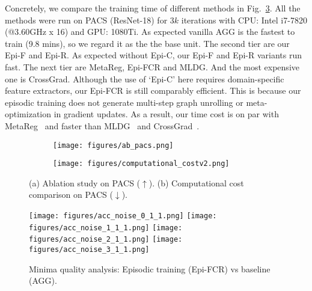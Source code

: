 \documentclass[10pt,twocolumn,letterpaper]{article}
\begin{document}
Concretely, we compare the training time of different methods in Fig.~\ref{fig:comp-cost}. All the methods were run on PACS (ResNet-18) for $3k$ iterations with CPU: Intel i7-7820 (@3.60GHz x 16) and GPU: 1080Ti. As expected vanilla AGG is the fastest to train (9.8 mins), so we regard it as the the base unit. The second tier are our Epi-F and Epi-R. As expected without Epi-C, our Epi-F and Epi-R variants run fast. The next tier are MetaReg, Epi-FCR and MLDG. And the most expensive one is CrossGrad. Although the use of `Epi-C' here requires domain-specific feature extractors, our Epi-FCR is still comparably efficient. This is because our episodic training does not generate multi-step graph unrolling or meta-optimization in gradient updates. As a result, our time cost is on par with MetaReg~\cite{NIPS2018_metareg} and faster than MLDG~\cite{Li2018MLDG} and CrossGrad~\cite{shankar2018generalizing}. 







\begin{figure}[t]
    \centering
    \begin{subfigure}[b]{0.4185\linewidth}
    \texttt{[image: figures/ab\_pacs.png]}
    \vspace{-0.77cm}
    \caption{}
    \label{fig:ab-pacs}
    \end{subfigure}
    \begin{subfigure}[b]{0.5715\linewidth}
    \texttt{[image: figures/computational\_costv2.png]}
    \vspace{-0.63cm}
    \caption{}
    \label{fig:comp-cost}
    \end{subfigure}
    \vspace{-0.7cm}
    \caption{\small (a) Ablation study on PACS ($\uparrow$). (b) Computational cost comparison on PACS ($\downarrow$).}
\vspace{-0.3cm}
\end{figure}






\begin{figure*}[tb]
    \centering
    \texttt{[image: figures/acc\_noise\_0\_1\_1.png]}
    \texttt{[image: figures/acc\_noise\_1\_1\_1.png]}
    \texttt{[image: figures/acc\_noise\_2\_1\_1.png]}
    \texttt{[image: figures/acc\_noise\_3\_1\_1.png]}
    \vspace{-0.3cm}
    \caption{\small Minima quality analysis: Episodic training (Epi-FCR) vs baseline (AGG). 
    }
\label{fig:acc-vs-noise}
\end{figure*}
\end{document}
